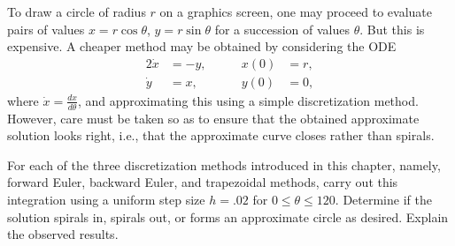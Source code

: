 \begin{problem}[A\&P 3.2]
  To draw a circle of radius $r$ on a graphics screen, one may proceed to evaluate pairs of values $x = r \cos \theta$, $y = r \sin \theta$ for a succession of values $\theta$. But this is expensive. A cheaper method may be obtained by considering the ODE
  \begin{alignat*}{2}
    \dot{x} &= -y, \quad&\quad x(0) &= r, \\
    \dot{y} &= x,  \quad&\quad y(0) &= 0, 
  \end{alignat*}
  where $\dot{x} = \frac{dx}{d\theta}$, and approximating this using a simple discretization method. However, care must be taken so as to ensure that the obtained approximate solution looks right, i.e., that the approximate curve closes rather than spirals.
  
  For each of the three discretization methods introduced in this chapter, namely, forward Euler, backward Euler, and trapezoidal methods, carry out this integration using a uniform step size $h = .02$ for $0 \leq \theta \leq 120$. Determine if the solution spirals in, spirals out, or forms an approximate circle as desired. Explain the observed results.
\end{problem}
